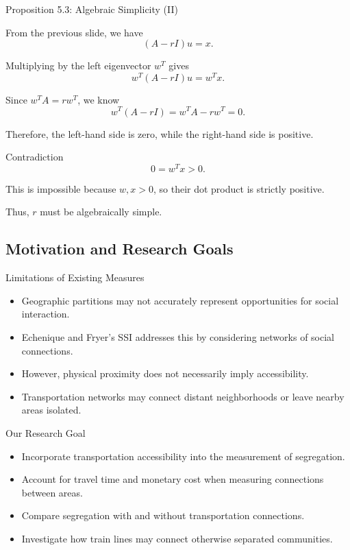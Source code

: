 \documentclass[aspectratio=169,10pt]{beamer}
\begin{document}
\begin{frame}[shrink=0]{Proposition 5.3: Algebraic Simplicity (II)}
\small

From the previous slide, we have
\[
(A-rI)u=x.
\]

Multiplying by the left eigenvector $w^T$ gives
\[
w^T(A-rI)u=w^Tx.
\]

Since $w^TA=rw^T$, we know
\[
w^T(A-rI)=w^TA-rw^T=0.
\]

Therefore, the left-hand side is zero,
while the right-hand side is positive.

\begin{block}{Contradiction}
\[
\boxed{0=w^Tx>0.}
\]

This is impossible because $w,x>0$,
so their dot product is strictly positive.

Thus, $r$ must be algebraically simple.
\end{block}

\end{frame}


\subsection{Motivation and Research Goals}
\begin{frame}[shrink=0]{Limitations of Existing Measures}
\begin{itemize}
    \item Geographic partitions may not accurately
    represent opportunities for social interaction.

    \item Echenique and Fryer's SSI addresses this
    by considering networks of social connections.

    \item However, physical proximity does not
    necessarily imply accessibility.

    \item Transportation networks may connect distant
    neighborhoods or leave nearby areas isolated.
\end{itemize}
\end{frame}

\begin{frame}[shrink=0]{Our Research Goal}
\begin{itemize}
    \item Incorporate transportation accessibility
    into the measurement of segregation.

    \item Account for travel time and monetary cost
    when measuring connections between areas.

    \item Compare segregation with and without
    transportation connections.

    \item Investigate how train lines may connect
    otherwise separated communities.
\end{itemize}
\end{frame}
\end{document}
